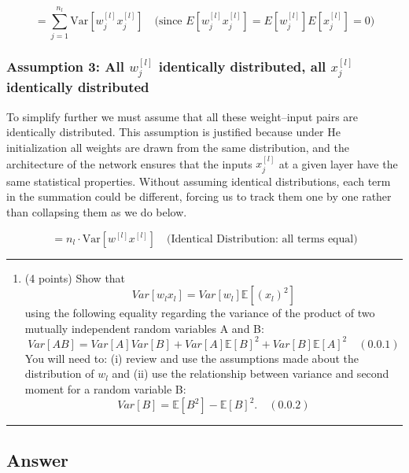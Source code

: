 \documentclass[
  letterpaper,
  DIV=11,
  numbers=noendperiod]{scrartcl}
\providecommand{\tightlist}{%
  \setlength{\itemsep}{0pt}\setlength{\parskip}{0pt}}\usepackage{longtable,booktabs,array}
\begin{document}
\[= \sum_{j=1}^{n_l} \text{Var}[w_j^{[l]} x_j^{[l]}] \quad \text{(since } E[w_j^{[l]} x_j^{[l]}] = E[w_j^{[l]}]E[x_j^{[l]}] = 0)\]

\subsubsection{\texorpdfstring{Assumption 3: All \(w_j^{[l]}\)
identically distributed, all \(x_j^{[l]}\) identically
distributed}{Assumption 3: All w\_j\^{}\{{[}l{]}\} identically distributed, all x\_j\^{}\{{[}l{]}\} identically distributed}}\label{assumption-3-all-w_jl-identically-distributed-all-x_jl-identically-distributed}

To simplify further we must assume that all these weight--input pairs
are identically distributed. This assumption is justified because under
He initialization all weights are drawn from the same distribution, and
the architecture of the network ensures that the inputs \(x_j^{[l]}\) at
a given layer have the same statistical properties. Without assuming
identical distributions, each term in the summation could be different,
forcing us to track them one by one rather than collapsing them as we do
below.

\[= n_l \cdot \text{Var}[w^{[l]} x^{[l]}] \quad \text{(Identical Distribution: all terms equal)}\]

\begin{center}\rule{0.5\linewidth}{0.5pt}\end{center}

\begin{enumerate}
\def\labelenumi{\arabic{enumi}.}
\setcounter{enumi}{1}
\tightlist
\item
  (4 points) Show that
  \[Var[w_{l}x_{l}]=Var[w_{l}]\mathbb{E}[(x_{l})^{2}]\]using the
  following equality regarding the variance of the product of two
  mutually independent random variables A and
  B:\[Var[AB]=Var[A]Var[B]+Var[A]\mathbb{E}[B]^{2}+Var[B]\mathbb{E}[A]^{2} \quad (0.0.1)\]You
  will need to: (i) review and use the assumptions made about the
  distribution of \(w_{l}\) and (ii) use the relationship between
  variance and second moment for a random variable
  B:\[Var[B]=\mathbb{E}[B^{2}]-\mathbb{E}[B]^{2}. \quad (0.0.2)\]
\end{enumerate}

\begin{center}\rule{0.5\linewidth}{0.5pt}\end{center}

\subsection{Answer}\label{answer-1}
\end{document}
